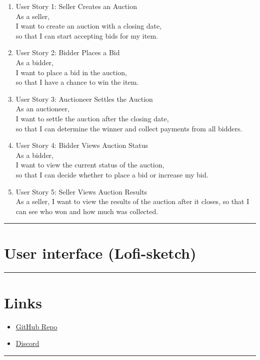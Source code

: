 \documentclass[10pt]{article}
\begin{document}
\begin{enumerate}
    \item User Story 1: Seller Creates an Auction\\
    As a seller,\\
    I want to create an auction with a closing date,\\
    so that I can start accepting bids for my item.

    \item User Story 2: Bidder Places a Bid\\
    As a bidder,\\
    I want to place a bid in the auction,\\
    so that I have a chance to win the item.

    \item User Story 3: Auctioneer Settles the Auction\\
    As an auctioneer,\\
    I want to settle the auction after the closing date,\\
    so that I can determine the winner and collect payments from all bidders.

    \item User Story 4: Bidder Views Auction Status\\
    As a bidder,\\
    I want to view the current status of the auction,\\
    so that I can decide whether to place a bid or increase my bid.

    \item User Story 5: Seller Views Auction Results\\
    As a seller,
    I want to view the results of the auction after it closes,
    so that I can see who won and how much was collected.
\end{enumerate}
\noindent\rule{8cm}{0.4pt} %
\section{User interface (Lofi-sketch)}


\noindent\rule{8cm}{0.4pt} %

\section{Links}

\begin{itemize}
    \item \href{https://github.com/SIRL-TAMU/all-pay-auction}{GitHub Repo}
    \item \href{https://discord.gg/37kNGVctuf}{Discord}
\end{itemize}


\noindent\rule{8cm}{0.4pt} %
\end{document}
